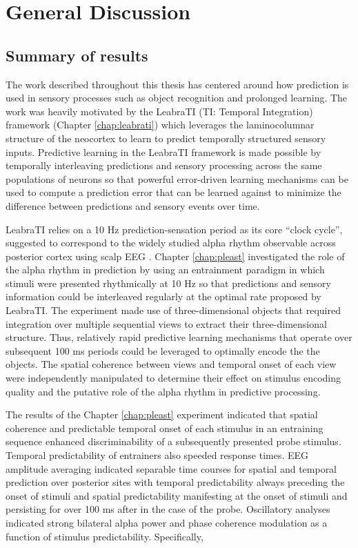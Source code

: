 \documentclass[dwyatte_dissertation.tex]{subfiles}
\begin{document}
\sloppy

\chapter{General Discussion}
\section{Summary of results}
The work described throughout this thesis has centered around how prediction is used in sensory processes such as object recognition and prolonged learning. The work was heavily motivated by the LeabraTI (TI: Temporal Integration) framework (Chapter \ref{chap:leabrati}) which leverages the laminocolumnar structure of the neocortex \cite{Mountcastle97,BuxhoevedenCasanova02,HortonAdams05} to learn to predict temporally structured sensory inputs. Predictive learning in the LeabraTI framework is made possible by temporally interleaving predictions and sensory processing across the same populations of neurons so that powerful error-driven learning mechanisms \cite{OReillyMunakata00,OReillyMunakataFrankEtAl12} can be used to compute a prediction error that can be learned against to minimize the difference between predictions and sensory events over time.

LeabraTI relies on a 10 Hz prediction-sensation period as its core ``clock cycle'', suggested to correspond to the widely studied alpha rhythm observable across posterior cortex using scalp EEG \cite{PalvaPalva07,HanslmayrGrossKlimeschEtAl11,VanRullenBuschDrewesEtAl11}. Chapter \ref{chap:pleast} investigated the role of the alpha rhythm in prediction by using an entrainment paradigm \cite{SchroederLakatosKajikawaEtAl08,CalderoneLakatosButlerEtAlInPress} in which stimuli were presented rhythmically at 10 Hz so that predictions and sensory information could be interleaved regularly at the optimal rate proposed by LeabraTI. The experiment made use of three-dimensional objects that required integration over multiple sequential views to extract their three-dimensional structure. Thus, relatively rapid predictive learning mechanisms that operate over subsequent 100 ms periods could be leveraged to optimally encode the the objects. The spatial coherence between views and temporal onset of each view were independently manipulated to determine their effect on stimulus encoding quality and the putative role of the alpha rhythm in predictive processing.

The results of the Chapter \ref{chap:pleast} experiment indicated that spatial coherence and predictable temporal onset of each stimulus in an entraining sequence enhanced discriminability of a subsequently presented probe stimulus. Temporal predictability of entrainers also speeded response times. EEG amplitude averaging indicated separable time courses for spatial and temporal prediction over posterior sites with temporal predictability always preceding the onset of stimuli and spatial predictability manifesting at the onset of stimuli and persisting for over 100 ms after in the case of the probe. Oscillatory analyses indicated strong bilateral alpha power and phase coherence modulation as a function of stimulus predictability. Specifically, 
\end{document}
